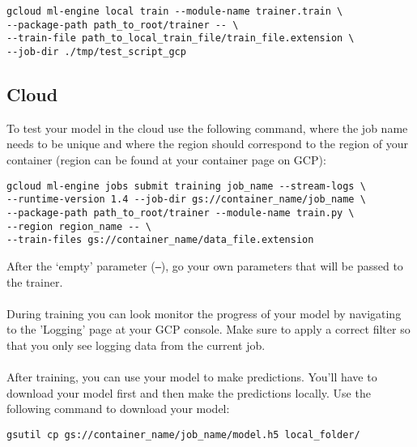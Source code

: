 \documentclass{article}
\begin{document}
\begin{verbatim}
gcloud ml-engine local train --module-name trainer.train \ 
--package-path path_to_root/trainer -- \
--train-file path_to_local_train_file/train_file.extension \
--job-dir ./tmp/test_script_gcp
\end{verbatim}


\subsection{Cloud}
To test your model in the cloud use the following command, where the job name needs to be unique and where the region should correspond to the region of your container (region can be found at your container page on GCP):
\begin{verbatim}
gcloud ml-engine jobs submit training job_name --stream-logs \
--runtime-version 1.4 --job-dir gs://container_name/job_name \
--package-path path_to_root/trainer --module-name train.py \
--region region_name -- \
--train-files gs://container_name/data_file.extension
\end{verbatim}
After the `empty' parameter (\texttt{--}), go your own parameters that will be passed to the trainer. \\
\\
During training you can look monitor the progress of your model by navigating to the 'Logging' page at your GCP console. Make sure to apply a correct filter so that you only see logging data from the current job.
\\
\\
After training, you can use your model to make predictions. You'll have to download your model first and then make the predictions locally. Use the following command to download your model:
\begin{verbatim}
gsutil cp gs://container_name/job_name/model.h5 local_folder/
\end{verbatim}
\end{document}
